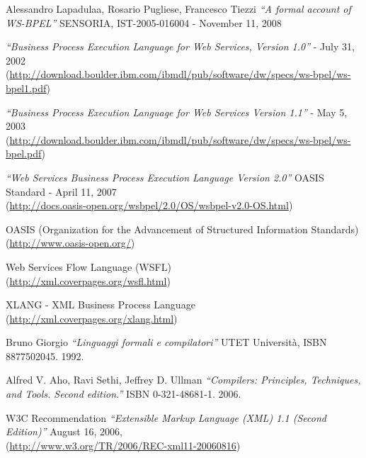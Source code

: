 \begin{thebibliography}{99}

 Alessandro Lapadulaa, Rosario Pugliese, Francesco
Tiezzi \emph{``A formal account of WS-BPEL''} SENSORIA, IST-2005-016004
- November 11, 2008

 \emph{``Business Process Execution Language for Web Services,
Version 1.0''} - July 31, 2002 \\
(\href{http://download.boulder.ibm.com/ibmdl/pub/software/dw/specs/ws-bpel/ws-bpel1.pdf}{http://download.boulder.ibm.com/ibmdl/pub/software/dw/specs/ws-bpel/ws-bpel1.pdf})

 \emph{``Business Process Execution Language for Web
Services Version 1.1''} - May 5, 2003 \\
(\href{http://download.boulder.ibm.com/ibmdl/pub/software/dw/specs/ws-bpel/ws-bpel.pdf}{http://download.boulder.ibm.com/ibmdl/pub/software/dw/specs/ws-bpel/ws-bpel.pdf})

 \emph{``Web Services Business Process Execution Language
Version 2.0''} OASIS Standard - April 11, 2007 \\
(\href{http://docs.oasis-open.org/wsbpel/2.0/OS/wsbpel-v2.0-OS.html}{http://docs.oasis-open.org/wsbpel/2.0/OS/wsbpel-v2.0-OS.html})

 OASIS (Organization for the Advancement of Structured
Information Standards)\\
(\href{http://www.oasis-open.org/}{http://www.oasis-open.org/})

 Web Services Flow Language (WSFL)\\
(\href{http://xml.coverpages.org/wsfl.html}{http://xml.coverpages.org/wsfl.html})

 XLANG - XML Business Process Language \\
(\href{http://xml.coverpages.org/xlang.html}{http://xml.coverpages.org/xlang.html})

 Bruno Giorgio \emph{``Linguaggi formali e compilatori''} 
UTET Università, ISBN 8877502045. 1992.

 Alfred V. Aho, Ravi Sethi, Jeffrey D. Ullman
\emph{``Compilers: Principles, Techniques, and Tools. Second edition.''} ISBN
0-321-48681-1. 2006.

 W3C Recommendation \emph{``Extensible Markup Language (XML) 1.1
(Second Edition)''} August 16, 2006,\\
(\href{http://www.w3.org/TR/2006/REC-xml11-20060816}{http://www.w3.org/TR/2006/REC-xml11-20060816})


\end{thebibliography}
